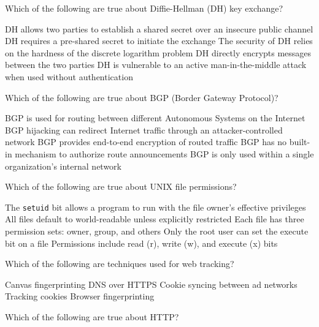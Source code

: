 \documentclass[addpoints]{exam}
\begin{document}
\begin{questions}
\question Which of the following are true about Diffie-Hellman (DH) key exchange?

\begin{checkboxes}
  \CorrectChoice DH allows two parties to establish a shared secret over an insecure public channel
  \choice DH requires a pre-shared secret to initiate the exchange
  \CorrectChoice The security of DH relies on the hardness of the discrete logarithm problem
  \choice DH directly encrypts messages between the two parties
  \CorrectChoice DH is vulnerable to an active man-in-the-middle attack when used without authentication
\end{checkboxes}


\question Which of the following are true about BGP (Border Gateway Protocol)?

\begin{checkboxes}
  \CorrectChoice BGP is used for routing between different Autonomous Systems on the Internet
  \CorrectChoice BGP hijacking can redirect Internet traffic through an attacker-controlled network
  \choice BGP provides end-to-end encryption of routed traffic
  \CorrectChoice BGP has no built-in mechanism to authorize route announcements
  \choice BGP is only used within a single organization's internal network
\end{checkboxes}



\question Which of the following are true about UNIX file permissions?

\begin{checkboxes}
  \CorrectChoice The \texttt{setuid} bit allows a program to run with the file owner's effective privileges
  \choice All files default to world-readable unless explicitly restricted
  \CorrectChoice Each file has three permission sets: owner, group, and others
  \choice Only the root user can set the execute bit on a file
  \CorrectChoice Permissions include read (r), write (w), and execute (x) bits
\end{checkboxes}


\question Which of the following are techniques used for web tracking?

\begin{checkboxes}
  \CorrectChoice Canvas fingerprinting
  \choice DNS over HTTPS
  \CorrectChoice Cookie syncing between ad networks
  \CorrectChoice Tracking cookies
  \CorrectChoice Browser fingerprinting
\end{checkboxes}


\question Which of the following are true about HTTP?


\end{questions}
\end{document}
